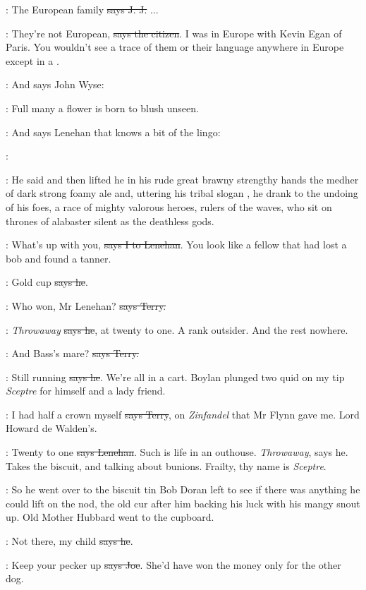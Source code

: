 \jjom:
The European family
\sout{says J. J.} ...

\citizen:
They're not European, \sout{says the citizen}.
I was in Europe with Kevin Egan
of Paris. You wouldn't see a trace of them or their language anywhere in
Europe except in a .

\Nq:
And says John Wyse:

\johnwyse:
Full many a flower is born to blush unseen.

\Nq:
And says Lenehan that knows a bit of the lingo:

\lenehan:

:
He said and then lifted he in his rude great brawny strengthy hands
the medher of dark strong foamy ale and, uttering his tribal slogan , he drank to the undoing of his foes, a race of mighty valorous
heroes, rulers of the waves, who sit on thrones of alabaster silent as the
deathless gods.

:
What's up with you, \sout{says I to Lenehan}.
You look like a fellow that had
lost a bob and found a tanner.

\lenehan:
Gold cup \sout{says he}.

\terry:
Who won, Mr Lenehan? \sout{says Terry.}

\lenehan:
\emph{Throwaway} \sout{says he}, at twenty to one.
A rank outsider. And the rest
nowhere.

\terry:
And Bass's mare? \sout{says Terry.}

\lenehan:
Still running \sout{says he}.
We're all in a cart. Boylan plunged two quid on
my tip \emph{Sceptre} for himself and a lady friend.

\terry:
I had half a crown myself \sout{says Terry},
on \emph{Zinfandel} that Mr Flynn gave
me. Lord Howard de Walden's.

\lenehan:
Twenty to one \sout{says Lenehan}.
Such is life in an outhouse. \emph{Throwaway},
says he. Takes the biscuit, and talking about bunions. Frailty, thy name
is \emph{Sceptre}.

\Nq:
So he went over to the biscuit tin Bob Doran left to see if there was
anything he could lift on the nod, the old cur after him backing his luck
with his mangy snout up. Old Mother Hubbard went to the cupboard.

\lenehan:
Not there, my child \sout{says he}.

\joe:
Keep your pecker up \sout{says Joe}.
She'd have won the money only for the
other dog.

